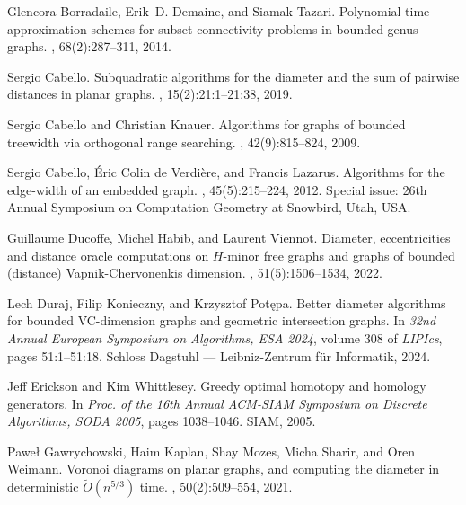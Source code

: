 \documentclass[11pt,a4paper]{article}
\begin{document}

\begin{thebibliography}{10}

  Glencora Borradaile, Erik~D. Demaine, and Siamak Tazari.
  \newblock Polynomial-time approximation schemes for subset-connectivity problems in bounded-genus graphs.
  , 68(2):287--311, 2014.
  
  Sergio Cabello.
  \newblock Subquadratic algorithms for the diameter and the sum of pairwise distances in planar graphs.
  , 15(2):21:1--21:38, 2019.
  
  Sergio Cabello and Christian Knauer.
  \newblock Algorithms for graphs of bounded treewidth via orthogonal range searching.
  , 42(9):815--824, 2009.
  
  Sergio Cabello, Éric {Colin de Verdière}, and Francis Lazarus.
  \newblock Algorithms for the edge-width of an embedded graph.
  , 45(5):215--224, 2012.
  \newblock Special issue: 26th Annual Symposium on Computation Geometry at Snowbird, Utah, USA.
  
  Guillaume Ducoffe, Michel Habib, and Laurent Viennot.
  \newblock Diameter, eccentricities and distance oracle computations on ${H}$-minor free graphs and graphs of bounded (distance) {V}apnik-{C}hervonenkis dimension.
  , 51(5):1506--1534, 2022.
  
  Lech Duraj, Filip Konieczny, and Krzysztof Pot\k{e}pa.
  \newblock Better diameter algorithms for bounded {VC}-dimension graphs and geometric intersection graphs.
  \newblock In {\em 32nd Annual European Symposium on Algorithms, {ESA} 2024}, volume 308 of {\em LIPIcs}, pages 51:1--51:18. Schloss Dagstuhl --- Leibniz-Zentrum f{\"{u}}r Informatik, 2024.
  
  Jeff Erickson and Kim Whittlesey.
  \newblock Greedy optimal homotopy and homology generators.
  \newblock In {\em Proc. of the 16th Annual {ACM-SIAM} Symposium on Discrete Algorithms, {SODA} 2005}, pages 1038--1046. {SIAM}, 2005.
  
  Pawe\l{} Gawrychowski, Haim Kaplan, Shay Mozes, Micha Sharir, and Oren Weimann.
  \newblock Voronoi diagrams on planar graphs, and computing the diameter in deterministic $\widetilde{O}(n^{5/3})$ time.
  , 50(2):509--554, 2021.
  

\end{thebibliography}
\end{document}
